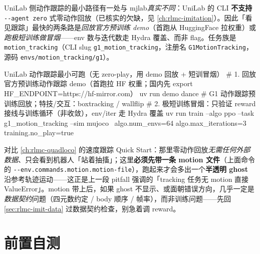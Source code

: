 UniLab 侧动作跟踪的最小路径有一处与 mjlab\emph{真实不同}：UniLab 的 CLI \textbf{不支持} \verb|--agent zero| 式零动作回放（已核实的欠缺，见 \cref{ch:rlmc-imitation}）。因此「看见跟踪」最快的两条路是\emph{回放官方预训练 demo}（首跑从 HuggingFace 拉权重）或\emph{跑极短训练做冒烟}——env 数与迭代数走 Hydra 覆盖、而非 flag。任务族是 \verb|motion_tracking|（CLI slug \verb|g1_motion_tracking|，注册名 \verb|G1MotionTracking|，源码 \verb|envs/motion_tracking/g1|）。

\begin{codebox}[bash]{UniLab 动作跟踪最小可跑（无 zero-play，用 demo 回放 + 短训冒烟）}
# 1. 回放官方预训练动作跟踪 demo（首跑拉 HF 权重；国内先 export HF_ENDPOINT=https://hf-mirror.com）
uv run demo dance          # G1 动作跟踪预训练回放；特技/交互：boxtracking / wallflip
# 2. 极短训练冒烟：只验证 reward 接线与训练循环（非收敛），env/iter 走 Hydra 覆盖
uv run train --algo ppo --task g1_motion_tracking --sim mujoco \
    algo.num_envs=64 algo.max_iterations=3 training.no_play=true
\end{codebox}

\begin{note}
对比 \cref{ch:rlmc-quadloco} 的速度跟踪 Quick Start：那里零动作回放\emph{无需任何外部数据}、只会看到机器人「站着抽搐」；这里\textbf{必须先带一条 motion 文件}（上面命令的 \verb|--env.commands.motion.motion-file|），跑起来才会多出一个\textbf{半透明 ghost} 沿参考轨迹运动——这正是上一段 pitfall 强调的「tracking 任务无 motion 直接 ValueError」。motion 带上后，如果 ghost 不显示、或面朝错误方向，几乎一定是\emph{数据契约}问题（四元数约定 / body 顺序 / 帧率），而非训练问题——先回 \cref{sec:rlmc-imit-data} 过数据契约检查，别急着调 reward。
\end{note}

\section*{前置自测}
\label{sec:rlmc-mi-pretest}

